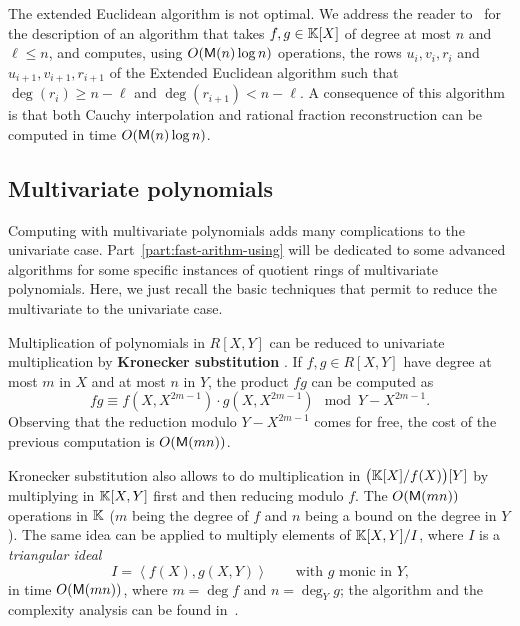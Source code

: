The extended Euclidean algorithm is not optimal. We address the reader
to~\cite[$\S$11.1]{vzGG} for the description of an algorithm that
takes $f,g\in\mathbb{K}[X]$ of degree at most $n$ and $\ell\le n$, and
computes, using $O(\mathsf{M}(n)\log n)$ operations, the rows $u_i,v_i,r_i$
and $u_{i+1},v_{i+1},r_{i+1}$ of the Extended Euclidean algorithm such
that $\deg(r_i)\ge n-\ell$ and $\deg(r_{i+1})<n-\ell$. A consequence
of this algorithm is that both Cauchy interpolation and rational
fraction reconstruction can be computed in time $O(\mathsf{M}(n)\log n)$.



\subsection{Multivariate polynomials}
\label{sec:mult-polyn}
Computing with multivariate polynomials adds many complications to the
univariate case. Part~\ref{part:fast-arithm-using} will be dedicated
to some advanced algorithms for some specific instances of quotient
rings of multivariate polynomials. Here, we just recall the basic
techniques that permit to reduce the multivariate to the univariate
case.

Multiplication of polynomials in $R[X,Y]$ can be reduced to univariate
multiplication by \textbf{Kronecker
  substitution} \cite{vzGG,vzgathen+shoup92,harvey09}. If $f,g\in
R[X,Y]$ have degree at most $m$ in $X$ and at most $n$ in $Y$, the
product $fg$ can be computed as
\begin{equation}
  \label{eq:222}
  fg \equiv f(X,X^{2m-1})\cdot g(X,X^{2m-1}) \mod Y-X^{2m-1}
  \text{.}
\end{equation}
Observing that the reduction modulo $Y-X^{2m-1}$ comes for free, the
cost of the previous computation is $O(\mathsf{M}(mn))$.

Kronecker substitution also allows to do multiplication in
$\bigl(\mathbb{K}[X]/f(X)\bigr)[Y]$ by multiplying in $\mathbb{K}[X,Y]$ first and then
reducing modulo $f$. The $O(\mathsf{M}(mn))$ operations in $\mathbb{K}$ ($m$ being
the degree of $f$ and $n$ being a bound on the degree in $Y$). The
same idea can be applied to multiply elements of $\mathbb{K}[X,Y]/I$, where $I$
is a \emph{triangular ideal}
\begin{equation}
  \label{eq:228}
  I = \left\langle f(X), g(X,Y)\right\rangle
  \qquad\text{with $g$ monic in $Y$,}
\end{equation}
in time $O(\mathsf{M}(mn))$, where $m=\deg f$ and $n=\deg_Y g$; the
algorithm and the complexity analysis can be found
in~\cite[Proposition~4]{pascal+schost06}.

